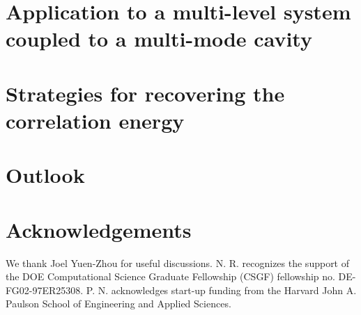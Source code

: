 \documentclass[aps,prb,twocolumn,
	groupedaddress,superscriptaddress,
	amsfonts,amssymb,amsmath,floatfix,
	citeautoscript]{revtex4-1}
\begin{document}
\section{Application to a multi-level system coupled to a multi-mode cavity}

\section{Strategies for recovering the correlation energy}

\section{Outlook}



\section{Acknowledgements}
We thank Joel Yuen-Zhou for useful discussions. N. R. recognizes the support of the DOE Computational Science Graduate Fellowship (CSGF) fellowship no.  DE-FG02-97ER25308. P. N. acknowledges start-up funding from the Harvard John A. Paulson School of Engineering and Applied Sciences. %



\end{document}
